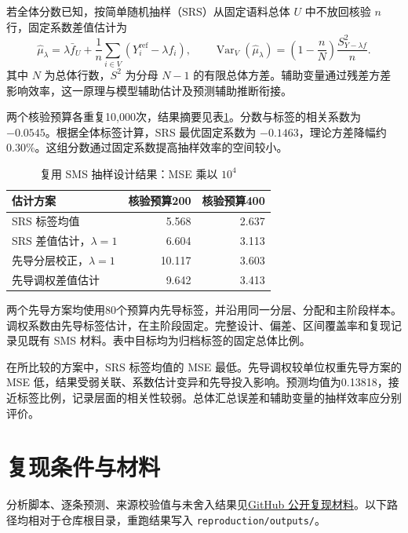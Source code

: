 \documentclass[UTF8,a4paper,zihao=-4,fontset=fandol]{ctexart}
\newcommand{\Var}{\operatorname{Var}}
\begin{document}
若全体分数已知，按简单随机抽样（SRS）从固定语料总体 $U$ 中不放回核验 $n$ 行，固定系数差值估计为
\begin{equation}
 \widehat\mu_\lambda=\lambda\bar f_U+
 \frac1n\sum_{i\in V}(Y_i^{\mathrm{ref}}-\lambda f_i),\qquad
 \Var_V(\widehat\mu_\lambda)=
 \left(1-\frac nN\right)\frac{S^2_{Y-\lambda f}}n.
 \label{eq:sms}
\end{equation}
其中 $N$ 为总体行数，$S^2$ 为分母 $N-1$ 的有限总体方差。辅助变量通过残差方差影响效率，这一原理与模型辅助估计及预测辅助推断衔接\citep{sarndal1992,ppi2023}。

两个核验预算各重复10,000次，结果摘要见表\ref{tab:sms}。分数与标签的相关系数为 $-0.0545$。根据全体标签计算，SRS 最优固定系数为 $-0.1463$，理论方差降幅约0.30\%。这组分数通过固定系数提高抽样效率的空间较小。

\begin{table}[htbp]
\centering\small
\caption{复用 SMS 抽样设计结果：MSE 乘以 $10^4$}\label{tab:sms}
\begin{tabular}{@{}lrr@{}}
\toprule
估计方案 & 核验预算200 & 核验预算400 \\
\midrule
SRS 标签均值 & 5.568 & 2.637 \\
SRS 差值估计，$\lambda=1$ & 6.604 & 3.113 \\
先导分层校正，$\lambda=1$ & 10.117 & 3.603 \\
先导调权差值估计 & 9.642 & 3.413 \\
\bottomrule
\end{tabular}
\vspace{0.3em}
\parbox{\textwidth}{\footnotesize 两个先导方案均使用80个预算内先导标签，并沿用同一分层、分配和主阶段样本。调权系数由先导标签估计，在主阶段固定。完整设计、偏差、区间覆盖率和复现记录见既有 SMS 材料。表中目标均为归档标签的固定总体比例。}
\end{table}

在所比较的方案中，SRS 标签均值的 MSE 最低。先导调权较单位权重先导方案的 MSE 低，结果受弱关联、系数估计变异和先导投入影响。预测均值为0.13818，接近标签比例，记录层面的相关性较弱。总体汇总误差和辅助变量的抽样效率应分别评价。

\section{复现条件与材料}\label{app:materials}

分析脚本、逐条预测、来源校验值与未舍入结果见\href{https://github.com/LeoAndJellyfish/semantic-decision-statistics}{GitHub 公开复现材料}。以下路径均相对于仓库根目录，重跑结果写入 \nolinkurl{reproduction/outputs/}。
\end{document}
